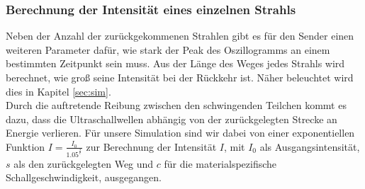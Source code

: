 \documentclass[reducespace,stylepage,semiarbeit]{spezidoc}
\begin{document}
\subsubsection{Berechnung der Intensität eines einzelnen Strahls}
Neben der Anzahl der zurückgekommenen Strahlen gibt es für den Sender einen weiteren Parameter dafür, wie stark der Peak des Oszillogramms an einem bestimmten Zeitpunkt sein muss. 
Aus der Länge des Weges jedes Strahls wird berechnet, wie groß seine Intensität bei der Rückkehr ist. 
Näher beleuchtet wird dies in Kapitel \ref{sec:sim}.\\
Durch die auftretende Reibung zwischen den schwingenden Teilchen kommt es dazu, dass die Ultraschallwellen abhängig von der zurückgelegten Strecke an Energie verlieren.
Für unsere Simulation sind wir dabei von einer exponentiellen Funktion $I = \frac{I_0}{1.05^{\tfrac{s}{c}}}$ zur Berechnung der Intensität $I$, mit $I_0$ als Ausgangsintensität, $s$ als den zurückgelegten Weg und $c$ für die materialspezifische Schallgeschwindigkeit, ausgegangen.  

\end{document}
